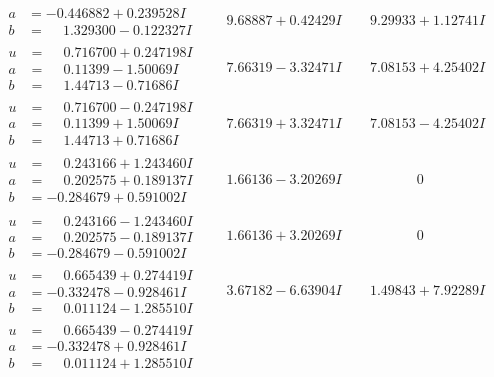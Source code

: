 \documentclass[1p]{elsarticle_modified}
\theoremstyle{definition}
\begin{document}
$$\begin{array}{c|c|c}
\begin{aligned}
a &= -0.446882 + 0.239528 I \\
b &= \phantom{-}1.329300 - 0.122327 I\end{aligned}
 & \phantom{-}9.68887 + 0.42429 I & \phantom{-}9.29933 + 1.12741 I \\ \hline\begin{aligned}
u &= \phantom{-}0.716700 + 0.247198 I \\
a &= \phantom{-}0.11399 - 1.50069 I \\
b &= \phantom{-}1.44713 - 0.71686 I\end{aligned}
 & \phantom{-}7.66319 - 3.32471 I & \phantom{-}7.08153 + 4.25402 I \\ \hline\begin{aligned}
u &= \phantom{-}0.716700 - 0.247198 I \\
a &= \phantom{-}0.11399 + 1.50069 I \\
b &= \phantom{-}1.44713 + 0.71686 I\end{aligned}
 & \phantom{-}7.66319 + 3.32471 I & \phantom{-}7.08153 - 4.25402 I \\ \hline\begin{aligned}
u &= \phantom{-}0.243166 + 1.243460 I \\
a &= \phantom{-}0.202575 + 0.189137 I \\
b &= -0.284679 + 0.591002 I\end{aligned}
 & \phantom{-}1.66136 - 3.20269 I & \phantom{-0.000000 } 0 \\ \hline\begin{aligned}
u &= \phantom{-}0.243166 - 1.243460 I \\
a &= \phantom{-}0.202575 - 0.189137 I \\
b &= -0.284679 - 0.591002 I\end{aligned}
 & \phantom{-}1.66136 + 3.20269 I & \phantom{-0.000000 } 0 \\ \hline\begin{aligned}
u &= \phantom{-}0.665439 + 0.274419 I \\
a &= -0.332478 - 0.928461 I \\
b &= \phantom{-}0.011124 - 1.285510 I\end{aligned}
 & \phantom{-}3.67182 - 6.63904 I & \phantom{-}1.49843 + 7.92289 I \\ \hline\begin{aligned}
u &= \phantom{-}0.665439 - 0.274419 I \\
a &= -0.332478 + 0.928461 I \\
b &= \phantom{-}0.011124 + 1.285510 I\end{aligned}

\end{array}$$
\end{document}
